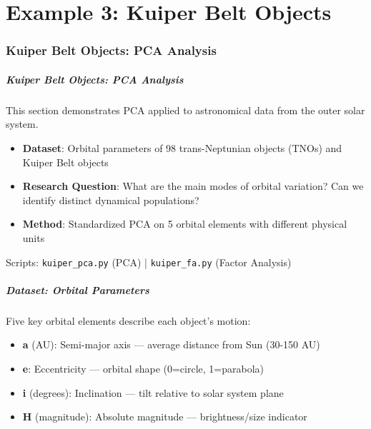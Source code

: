 \documentclass[aspectratio=169]{beamer}
\begin{document}

\part{Example 3: Kuiper Belt Objects}

\begin{frame}
    \partpage
\end{frame}

\section{Kuiper Belt Objects: PCA Analysis}

\begin{frame}
    \frametitle{Kuiper Belt Objects: PCA Analysis}
    This section demonstrates PCA applied to astronomical data from the outer solar system.
    \begin{itemize}
        \item \textbf{Dataset}: Orbital parameters of 98 trans-Neptunian objects (TNOs) and Kuiper Belt objects \pause
        \item \textbf{Research Question}: What are the main modes of orbital variation? Can we identify distinct dynamical populations? \pause
        \item \textbf{Method}: Standardized PCA on 5 orbital elements with different physical units \pause
    \end{itemize}
    \vspace{6pt}
    Scripts: \texttt{kuiper\_pca.py} (PCA) | \texttt{kuiper\_fa.py} (Factor Analysis)
\end{frame}

\begin{frame}
    \frametitle{Dataset: Orbital Parameters}
    Five key orbital elements describe each object's motion:
    \begin{itemize}
        \item \textbf{a} (AU): Semi-major axis — average distance from Sun (30-150 AU) \pause
        \item \textbf{e}: Eccentricity — orbital shape (0=circle, 1=parabola) \pause
        \item \textbf{i} (degrees): Inclination — tilt relative to solar system plane \pause
        \item \textbf{H} (magnitude): Absolute magnitude — brightness/size indicator \pause
    \end{itemize}
\end{frame}
\end{document}
